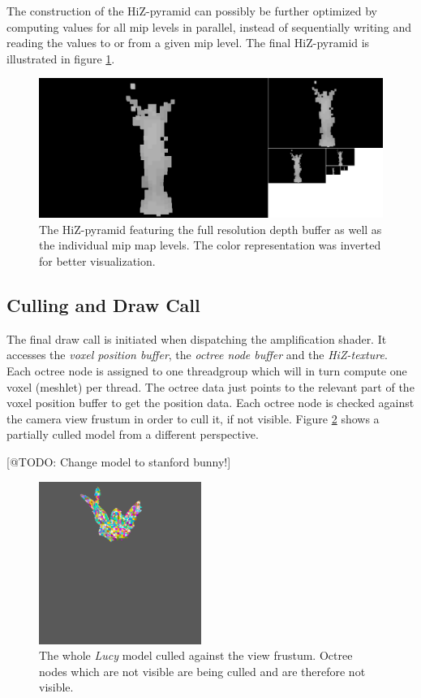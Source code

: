 \noindent
The construction of the \ac{HiZ}-pyramid can possibly be further optimized by computing values for all mip levels 
in parallel, instead of sequentially writing and reading the values to or from a given mip level. 
The final \ac{HiZ}-pyramid is illustrated in figure \ref{fig:lucy-hiz-pyramid}.

\begin{figure}[h]
    \centering
    \includegraphics[width=\linewidth]{images/graphics/lucy-hiz-pyramid-inverted.png}
    \caption{The \ac{HiZ}-pyramid featuring the full resolution depth buffer as well as the individual mip map 
    levels. The color representation was inverted for better visualization.}
    \label{fig:lucy-hiz-pyramid}
\end{figure}

\subsection*{Culling and Draw Call}

The final draw call is initiated when dispatching the amplification shader. It accesses the \emph{voxel position buffer}, 
the \emph{octree node buffer} and the \emph{\ac{HiZ}-texture}. Each octree node is assigned to one threadgroup which will 
in turn compute one voxel (meshlet) per thread. The octree data just points to the relevant part of the voxel position buffer 
to get the position data. Each octree node is checked against the camera view frustum in order to cull it, if not visible.
Figure \ref{fig:lucy-frustum-culling} shows a partially culled model from a different perspective. 

[@TODO: Change model to stanford bunny!]
\begin{figure}[h]
    \centering
    \includegraphics[width=200px]{images/graphics/lucy-frustum-culling.png}
    \caption{The whole \emph{Lucy} model culled against the view frustum. Octree nodes which are not visible are being 
    culled and are therefore not visible.}
    \label{fig:lucy-frustum-culling}
\end{figure}


